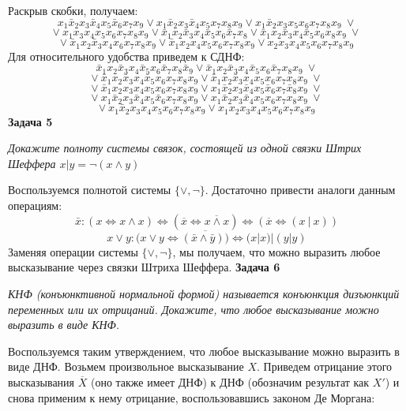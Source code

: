 \documentclass{article}
\begin{document}
Раскрыв скобки, получаем:
$$x_1\bar{x}_2 x_3 \bar{x}_4 x_5 \bar{x}_6 x_7 x_9 \vee x_1 \bar{x}_2 x_3 \bar{x}_4 x_5 x_7 x_8 x_9 \vee x_1 \bar{x}_2 x_3 x_5 x_6 x_7 x_8 x_9 ~ \vee$$ 
$$\vee ~ x_1 x_3 x_4 x_5 x_6 x_7 x_8 x_9 \vee \bar{x}_1 x_2 \bar{x}_3 x_4 \bar{x}_5 x_6 \bar{x}_7 x_8 \vee \bar{x}_1 x_2 \bar{x}_3 x_4 \bar{x}_5 x_6 x_8 x_9 ~\vee $$ 
$$\vee ~ \bar{x}_1 x_2 \bar{x}_3 x_4 x_6 x_7 x_8 x_9 \vee \bar{x}_1 x_2 x_4 x_5 x_6 x_7 x_8 x_9 \vee x_2 x_3 x_4 x_5 x_6 x_7 x_8 x_9$$
Для относительного удобства приведем к СДНФ:
$$\bar{x}_1 x_2 \bar{x}_3 x_4 \bar{x}_5 x_6 \bar{x}_7 x_8 \bar{x}_9 \vee \bar{x}_1 x_2 \bar{x}_3 x_4 \bar{x}_5 x_6 \bar{x}_7 x_8 x_9 ~ \vee$$
$$\vee~\bar{x}_1 x_2 \bar{x}_3 x_4 \bar{x}_5 x_6 x_7 x_8 x_9 \vee \bar{x}_1 x_2\bar{x}_3 x_4 x_5 x_6 x_7 x_8 x_9 ~\vee$$
$$\vee~\bar{x}_1 x_2 x_3 x_4 x_5 x_6 x_7 x_8 x_9 \vee x_1 \bar{x}_2 x_3 \bar{x}_4 x_5 \bar{x}_6 x_7 \bar{x}_8 x_9~\vee$$
$$\vee~x_1 \bar{x}_2 x_3 \bar{x}_4 x_5 \bar{x}_6 x_7 x_8 x_9 \vee x_1 \bar{x}_2 x_3 \bar{x}_4 x_5 x_6 x_7 x_8 x_9~\vee$$
$$\vee~x_1 \bar{x}_2 x_3 x_4 x_5 x_6 x_7 x_8 x_9 \vee x_1 x_2 x_3 x_4 x_5 x_6 x_7 x_8 x_9$$
\newline \newline
 \noindent \textbf{Задача 5}
\begin{center}
\textit{Докажите полноту системы связок, состоящей из одной связки Штрих Шеффера $x|y=\neg(x\wedge y)$} 
\end{center}
Воспользуемся полнотой системы $\{\vee, \neg\}$. Достаточно привести аналоги данным операциям:
$$\bar{x}: (x \Leftrightarrow x \wedge x) \Longleftrightarrow (\overline{x} \Leftrightarrow \overline{x \wedge x}) \Longleftrightarrow (\overline{x} \Leftrightarrow (x~|~x))$$
$$x \vee y : (x \vee y \Leftrightarrow \overline{(\bar{x}\wedge \bar{y}))} \Longleftrightarrow (x|x)|(y|y) $$
Заменяя операции системы $\{\vee, \neg\}$, мы получаем, что можно выразить любое высказывание через связки Штриха Шеффера.
\newline \newline
 \noindent \textbf{Задача 6}
\begin{center}
\textit{КНФ (конъюнктивной нормальной формой) называется конъюнкция дизъюнкций переменных или их отрицаний. Докажите, что любое высказывание можно выразить в виде КНФ.}
\end{center}
Воспользуемся таким утверждением, что любое высказывание можно выразить в виде ДНФ. Возьмем произвольное высказывание $X$. Приведем отрицание этого высказывания $\overline{X}$ (оно также имеет ДНФ) к ДНФ (обозначим результат как $X'$) и снова применим к нему отрицание, воспользовавшись законом Де Моргана:
\end{document}
